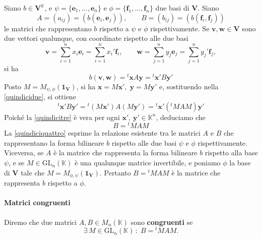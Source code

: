 \documentclass{article}
\theoremstyle{plain}
\theoremstyle{definition}
\theoremstyle{remark}
\begin{document}
Siano $b\in\mathbf{V}^{\mathbb{K}}$, e $\psi = \{\mathbf{e}_1, \ldots, \mathbf{e}_n\}$ e $\phi = \{\mathbf{f}_1, \ldots, \mathbf{f}_n\}$ due basi di $\mathbf{V}$. 
Siano
\[A = (a_{ij}) = (b(\mathbf{e}_i, \mathbf{e}_j)),\quad\quad B = (b_{ij}) = (b(\mathbf{f}_i, \mathbf{f}_j))\]
le matrici che rappresentano $b$ rispetto a $\psi$ e $\phi$ rispettivamente. Se $\mathbf{v}, \mathbf{w} \in \mathbf{V}$ sono 
due vettori qualunque, con coordinate rispetto alle due basi
\[\mathbf{v} = \sum_{i=1}^{n}x_i \mathbf{e}_i = \sum_{i=1}^{n}x_i' \mathbf{f}_i, \quad\quad \mathbf{w} = \sum_{j=1}^{n}y_j \mathbf{e}_j = \sum_{j=1}^{n}y_j' \mathbf{f}_j,\]
si ha
\begin{equation}\label{quindicidue}
b(\mathbf{v}, \mathbf{w}) = {}^t\mathbf{x} A \mathbf{y} = {}^t\mathbf{x}' B \mathbf{y}' 
\end{equation}
Posto $M = M_{\psi,\phi}(\mathbf{1_V})$, si ha $\mathbf{x} = M \mathbf{x}',\;\mathbf{y} = M \mathbf{y}'$ e, sostituendo nella \ref{quindicidue}, si ottiene
\begin{equation}\label{quindicitre}
{}^t\mathbf{x}' B \mathbf{y}' = {}^t(M\mathbf{x}') A (M\mathbf{y}') = {}^t\mathbf{x}' ({}^t M A M) \mathbf{y}'
\end{equation}
Poiché la \ref{quindicitre} è vera per ogni $\mathbf{x}'$, $\mathbf{y}' \in \mathbb{K}^n$, deduciamo che
\begin{equation}\label{quindiciquattro}
B = {}^t M A M
\end{equation}
La \ref{quindiciquattro} esprime la relazione esistente tra le matrici $A$ e $B$ che rappresentano la forma 
bilineare $b$ rispetto alle due basi $\psi$ e $\phi$ rispettivamente. Viceversa, se $A$ è la matrice che 
rappresenta la forma bilineare $b$ rispetto alla base $\psi$, e se $M \in \mathrm{GL}_n(\mathbb{K})$ è una qualunque 
matrice invertibile, e poniamo $\phi$ la base di $\mathbf{V}$ tale che $M = M_{\phi,\psi}(\mathbf{1_V})$. 
Pertanto $B = {}^t M A M$ è la matrice che rappresenta $b$ rispetto a $\phi$.

\vspace{10pt}

\paragraph{Matrici congruenti}
\begin{bxthm}
Diremo che due matrici $A, B \in M_n(\mathbb{K})$ sono \textbf{congruenti} se
\begin{equation}
\exists\,M \in \mathrm{GL}_n(\mathbb{K})\,:\;B = {}^t M A M.
\end{equation}
\end{bxthm}    
\end{document}
